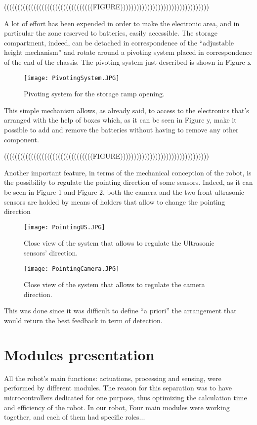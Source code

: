 (((((((((((((((((((((((((((((((((FIGURE)))))))))))))))))))))))))))))))))


A lot of effort has been expended in order to make the electronic area, and in particular the zone reserved to batteries, easily accessible.
The storage compartment, indeed, can be detached in correspondence of the “adjustable height mechanism” and rotate around a pivoting system placed in correspondence of the end of the chassis.
The pivoting system just described is shown in Figure x

\begin{figure}[H]
 \centering
 \texttt{[image: PivotingSystem.JPG]}
 \caption{Pivoting system for the storage ramp opening.}
\label{fig:PivotingSystem}
\end{figure}

This simple mechanism allows, as already said, to access to the electronics that’s arranged with the help of boxes which, as it can be seen in Figure y, make it possible to add and remove the batteries without having to remove any other component.

(((((((((((((((((((((((((((((((((FIGURE)))))))))))))))))))))))))))))))))

Another important feature, in terms of the mechanical conception of the robot, is the possibility to regulate the pointing direction of some sensors.
Indeed, as it can be seen in Figure 1 and Figure 2, both the camera and the two front ultrasonic sensors are holded by means of holders that allow to change the pointing direction

\begin{figure}[H]
 \centering
 \texttt{[image: PointingUS.JPG]}
 \caption{Close view of the system that allows to regulate the Ultrasonic sensors' direction.}
\label{fig:PointingUS}
\end{figure}

\begin{figure}[H]
 \centering
 \texttt{[image: PointingCamera.JPG]}
 \caption{Close view of the system that allows to regulate the camera direction.}
\label{fig:PointingCamera}
\end{figure}

This was done since it was difficult to define “a priori” the arrangement that would return the best feedback in term of detection.
\section{Modules presentation}
All the robot's main functions: actuations, processing and sensing, were performed by different modules. The reason for this separation was to have microcontrollers dedicated for one purpose, thus optimizing the calculation time and efficiency of the robot. In our robot, Four main modules were working together, and each of them had specific roles...